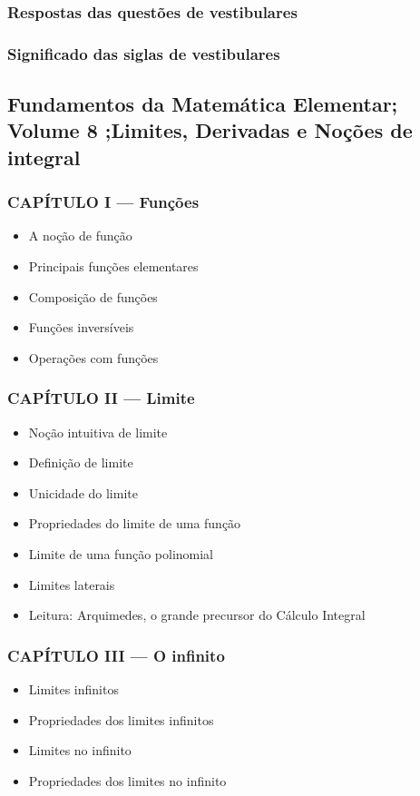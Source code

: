 \documentclass[a4paper,12pt]{article}[abntex2]
\begin{document}
\subsubsection*{Respostas das questões de vestibulares}

\subsubsection*{Significado das siglas de vestibulares}
 
 \subsection{Fundamentos da Matemática Elementar; Volume 8 ;Limites, Derivadas e Noções de integral}
\subsubsection*{CAPÍTULO I — Funções}

\begin{itemize}
\item A noção de função
\item Principais funções elementares
\item Composição de funções
\item Funções inversíveis
\item Operações com funções
\end{itemize}
\subsubsection*{CAPÍTULO II — Limite}

\begin{itemize}
\item Noção intuitiva de limite
\item Definição de limite
\item Unicidade do limite
\item Propriedades do limite de uma função
\item Limite de uma função polinomial
\item Limites laterais
\item Leitura: Arquimedes, o grande precursor do Cálculo Integral
\end{itemize}
\subsubsection*{CAPÍTULO III — O infinito}

\begin{itemize}
\item Limites infinitos
\item Propriedades dos limites infinitos
\item Limites no infinito
\item Propriedades dos limites no infinito
\end{itemize}
\end{document}
